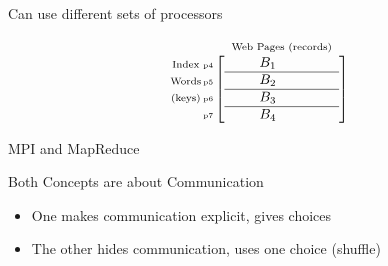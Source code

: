 \begin{frame}
\begin{block}{Can use different sets of processors}
\begin{center}
\begin{equation*}
\begin{array}{c@{\hspace{-2ex}}r@{\hspace{-2ex}}c}
          \begin{array}{c}
            \mbox{\scriptsize Index} \\
            \mbox{\scriptsize Words} \\
            \mbox{\scriptsize (keys)}
          \end{array} &
          \begin{array}{c}
            \\  \mbox{\tiny p4} \\ \mbox{\tiny p5} \\
            \mbox{\tiny p6} \\ \mbox{\tiny p7}
          \end{array} &
          \begin{array}{c}
            \mbox{\scriptsize Web Pages (records)} \\
            \left[
            \begin{array}{cccc}
              \quad  & B_1  & \quad & \quad \\
              \hline
              \quad  & B_2  & \quad  &  \quad \\
              \hline
              \quad  & B_3  & \quad  &  \quad \\
              \hline
              \quad  & B_4  & \quad  & \quad
            \end{array}
            \right]
          \end{array}
        \end{array}
      \end{equation*}
    \end{center}
  \end{block}
\end{frame}

\begin{frame}{MPI and MapReduce}
  \begin{block}{Both Concepts are about Communication}
    \begin{itemize}
    \item One makes communication explicit, gives choices
    \item The other hides communication, uses one choice (shuffle)
    \end{itemize}
  \end{block}
\end{frame}

